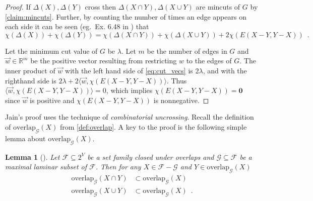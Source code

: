 \documentclass[10pt,a4paper]{article}
\newcommand{\R}{\mathbb{R}}
\newcommand{\zero}{\mathbf{0}}
\newcommand{\Fcal}{\mathcal{F}}
\newcommand{\Gcal}{\mathcal{G}}
\newcommand{\cross}{\mathrm{overlap}}
\newcommand{\braket}[2]{\langle#1, #2\rangle}
\newcommand{\1}{\mathbf{1}}
\newtheorem{lemma}[theorem]{Lemma}
\theoremstyle{definition}
\begin{document}
\begin{proof}
If $\Delta(X), \Delta(Y)$ cross then
$\Delta(X \cap Y), \Delta(X \cup Y)$ are mincuts of $G$ by \cref{claim:mincuts}.
Further, by counting the number of times an edge appears on each side it can be seen (eg.\ Ex. 6.48 in \cite{Lov93}) that
\begin{equation}
\label{eq:cut_vecs}
\chi(\Delta(X)) + \chi(\Delta(Y)) = \chi(\Delta(X \cap Y)) + \chi(\Delta(X \cup Y)) + 2\chi(E(X-Y, Y-X)) \enspace.
\end{equation}

Let the minimum cut value of $G$ be $\lambda$.  Let $m$ be the number of edges in $G$ and
$\vec{w} \in \R^m$ be the positive vector resulting from restricting $w$ to the edges of $G$.
The inner product of $\vec{w}$ with the left hand side of \cref{eq:cut_vecs}
is $2\lambda$, and with the righthand side is $2\lambda  + 2 \braket{\vec{w}}{\chi(E(X-Y, Y-X))}$.  Thus $\braket{\vec{w}}{\chi(E(X-Y, Y-X))} = 0$,
which implies $\chi(E(X-Y, Y-X)) = \zero$ since
$\vec{w}$ is positive and $\chi(E(X-Y, Y-X))$ is nonnegative.
\end{proof}


Jain's proof uses the technique of \emph{combinatorial uncrossing}.
Recall the definition of $\cross_{\Gcal}(X)$ from \cref{def:overlap}.   A key to the proof is the following simple lemma about
$\cross_{\Gcal}(X)$.
%
\begin{lemma}[\cite{Jain01}]
\label{lem:intersect}
Let $\Fcal \subseteq 2^{V}$ be a set family closed under overlaps and $\Gcal \subseteq \Fcal$ be a maximal laminar subset of $\Fcal$.
Then for any $X \in \Fcal - \Gcal$ and $Y \in \cross_{\Gcal}(X)$
\begin{align}
\label{eq:con_cap}
\cross_{\Gcal}(X \cap Y) & \subset \cross_{\Gcal}(X) \\
\label{eq:con_cup}
\cross_{\Gcal}(X \cup Y) &\subset \cross_{\Gcal}(X) \enspace .
\end{align}
\end{lemma}
\end{document}
